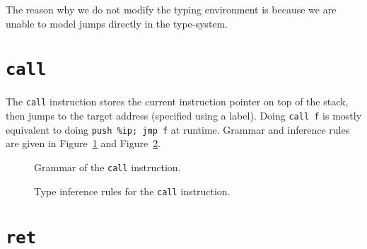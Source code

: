 The reason why we do not modify the typing environment is because we are unable to model jumps directly in the type-system.

\section{\texttt{call}}\label{sec:nstar-instructionset-call}

The \texttt{call} instruction stores the current instruction pointer on top of the stack, then jumps to the target address (specified using a label).
Doing \texttt{call f} is mostly equivalent to doing \texttt{push \%ip; jmp f} at runtime.
Grammar and inference rules are given in Figure~\ref{fig:nstar-instructionset-call-grammar} and Figure~\ref{fig:nstar-instructionset-call-typerules}.

\begin{figure}[H]
  \centering


  \caption{Grammar of the \texttt{call} instruction.}
  \label{fig:nstar-instructionset-call-grammar}
\end{figure}

\begin{figure}[H]
  \centering

  \begin{prooftree}
  \end{prooftree}

  \caption{Type inference rules for the \texttt{call} instruction.}
  \label{fig:nstar-instructionset-call-typerules}
\end{figure}

\section{\texttt{ret}}\label{sec:nstar-instructionset-ret}

